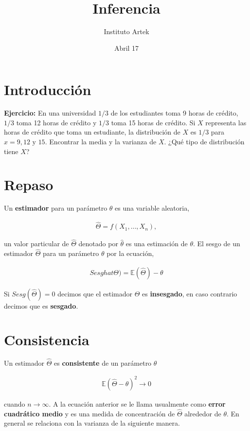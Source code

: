 \documentclass{article}
\title{Inferencia}
\author{Instituto Artek}
\date{Abril 17}
\newcommand{\Esp}{\mathbb{E}}
\begin{document}
\maketitle
\tableofcontents
\newpage

\section{Introducción}

\textbf{Ejercicio:}
En una universidad $1/3$ de los estudiantes toma 9 horas de crédito, $1/3$ toma 12 horas de crédito y $1/3$ toma 15 horas de crédito. Si $X$ representa las horas de crédito que toma un estudiante, la distribución de  $X$ es $1/3$ para $x=9,12 \text{ y } 15.$ Encontrar la media y la varianza de $X$. ¿Qué tipo de distribución tiene $X$?

\section{Repaso}

Un \textbf{estimador} para un parámetro $\theta$ es una variable aleatoria,

\begin{align*}
    \hat{\Theta} = f(X_1, \dots , X_n),
\end{align*}

un valor particular de $\hat{\Theta}$ denotado por $\hat{\theta}$ es una estimación de $\theta$. El sesgo de un estimador $\hat{\Theta}$ para un parámetro $\theta$ por la ecuación,

\begin{align*}
    Sesghat{\Theta})= \Esp (\hat{\Theta})- \theta
\end{align*}

Si $Sesg(\hat{\Theta})=0$ decimos que el estimador $\hat{\Theta}$ es \textbf{insesgado}, en caso contrario decimos que es \textbf{sesgado}.

\section{Consistencia}

Un estimador $\hat{\Theta}$ es \textbf{consistente} de un parámetro $\theta$ 

\begin{align*}
     \Esp(\hat{\Theta}-\theta)^2 \to 0
\end{align*}

cuando $n \to \infty$. A la ecuación anterior se le llama usualmente como \textbf{error cuadrático medio} y es una medida de concentración de $\hat{\Theta}$ alrededor de $\theta$. En general se relaciona con la varianza de la siguiente manera. 
\end{document}
